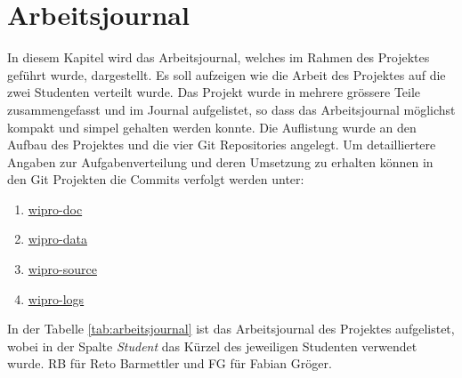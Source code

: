 \chapter{Arbeitsjournal}
\label{ch:arbeitsjournal}
In diesem Kapitel wird das Arbeitsjournal, welches im Rahmen des Projektes geführt wurde, dargestellt. Es soll aufzeigen
wie die Arbeit des Projektes auf die zwei Studenten verteilt wurde. Das Projekt wurde in mehrere grössere Teile
zusammengefasst und im Journal aufgelistet, so dass das Arbeitsjournal möglichst kompakt und simpel gehalten werden
konnte. Die Auflistung wurde an den Aufbau des Projektes und die vier Git Repositories angelegt. Um detailliertere
Angaben zur Aufgabenverteilung und deren Umsetzung zu erhalten können in den Git Projekten die Commits verfolgt werden
unter:
\begin{enumerate}
    \setlength\itemsep{0em}
    \item \hyperlink{https://gitlab.enterpriselab.ch/Pwn3rs/wipro-doc}{wipro-doc}
    \item \hyperlink{https://gitlab.enterpriselab.ch/Pwn3rs/wipro-data}{wipro-data}
    \item \hyperlink{https://gitlab.enterpriselab.ch/Pwn3rs/wipro-source}{wipro-source}
    \item \hyperlink{https://gitlab.enterpriselab.ch/Pwn3rs/wipro-logs}{wipro-logs}
\end{enumerate}
\noindent
In der Tabelle \ref{tab:arbeitsjournal} ist das Arbeitsjournal des Projektes aufgelistet, wobei in der Spalte
\textit{Student} das Kürzel des jeweiligen Studenten verwendet wurde. RB für Reto Barmettler und FG für Fabian Gröger.

